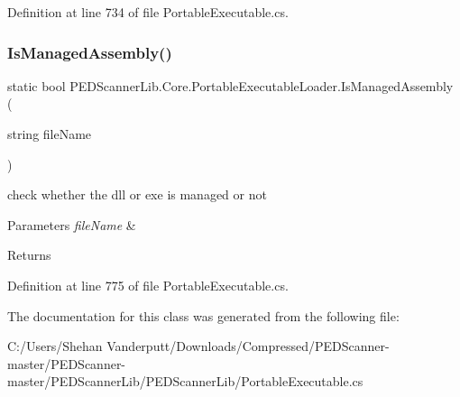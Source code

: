 Definition at line 734 of file Portable\+Executable.\+cs.

\mbox{\label{class_p_e_d_scanner_lib_1_1_core_1_1_portable_executable_loader_a857cacc5b0680f7fd26ab83c28e8ea13}} 
\subsubsection{\texorpdfstring{Is\+Managed\+Assembly()}{IsManagedAssembly()}}
{\footnotesize\ttfamily static bool P\+E\+D\+Scanner\+Lib.\+Core.\+Portable\+Executable\+Loader.\+Is\+Managed\+Assembly (\begin{DoxyParamCaption}\item[{string}]{file\+Name }\end{DoxyParamCaption})\hspace{0.3cm}{\ttfamily [static]}}



check whether the dll or exe is managed or not 


\begin{DoxyParams}{Parameters}
{\em file\+Name} & \\
\hline
\end{DoxyParams}
\begin{DoxyReturn}{Returns}

\end{DoxyReturn}


Definition at line 775 of file Portable\+Executable.\+cs.



The documentation for this class was generated from the following file\+:\begin{DoxyCompactItemize}
\item 
C\+:/\+Users/\+Shehan Vanderputt/\+Downloads/\+Compressed/\+P\+E\+D\+Scanner-\/master/\+P\+E\+D\+Scanner-\/master/\+P\+E\+D\+Scanner\+Lib/\+P\+E\+D\+Scanner\+Lib/Portable\+Executable.\+cs\end{DoxyCompactItemize}
